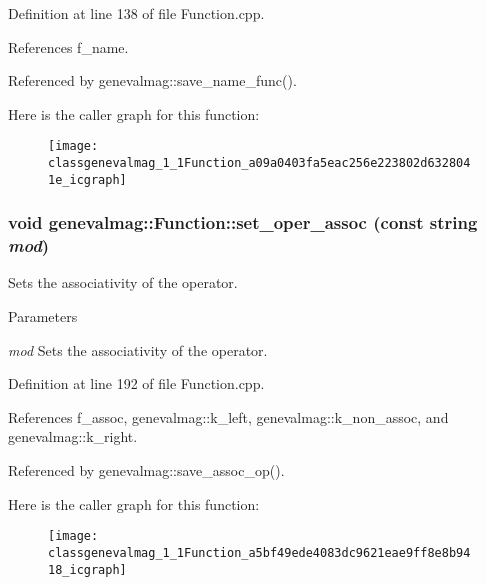 Definition at line 138 of file Function.cpp.



References f\_\-name.



Referenced by genevalmag::save\_\-name\_\-func().



Here is the caller graph for this function:\nopagebreak
\begin{figure}[H]
\begin{center}
\leavevmode
\texttt{[image: classgenevalmag\_1\_1Function\_a09a0403fa5eac256e223802d6328041e\_icgraph]}
\end{center}
\end{figure}


\hypertarget{classgenevalmag_1_1Function_a5bf49ede4083dc9621eae9ff8e8b9418}{
\subsubsection[{set\_\-oper\_\-assoc}]{\setlength{\rightskip}{0pt plus 5cm}void genevalmag::Function::set\_\-oper\_\-assoc (const string {\em mod})}}
\label{classgenevalmag_1_1Function_a5bf49ede4083dc9621eae9ff8e8b9418}
Sets the associativity of the operator. 
\begin{DoxyParams}{Parameters}
\item[{\em mod}]Sets the associativity of the operator. \end{DoxyParams}


Definition at line 192 of file Function.cpp.



References f\_\-assoc, genevalmag::k\_\-left, genevalmag::k\_\-non\_\-assoc, and genevalmag::k\_\-right.



Referenced by genevalmag::save\_\-assoc\_\-op().



Here is the caller graph for this function:\nopagebreak
\begin{figure}[H]
\begin{center}
\leavevmode
\texttt{[image: classgenevalmag\_1\_1Function\_a5bf49ede4083dc9621eae9ff8e8b9418\_icgraph]}
\end{center}
\end{figure}


